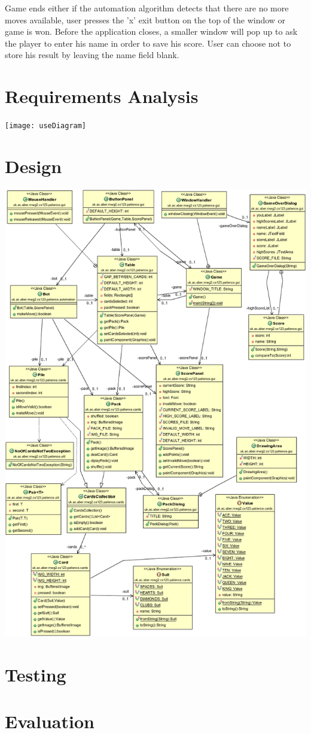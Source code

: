 \documentclass[a4paper, 12pt, titlepage]{article}
\begin{document}
Game ends either if the automation algorithm detects that there are no more moves 
available, user presses the 'x' exit button on the top of the window or game is won.
Before the application closes, a smaller window will pop up to ask the player to enter
his name in order to save his score. User can choose not to store his result by leaving
the name field blank.

\newpage

\section{Requirements Analysis}
\texttt{[image: useDiagram]}

\section{Design}
\includegraphics[width=\textwidth]{classDiagram}

\section{Testing}

\section{Evaluation}
\end{document}
